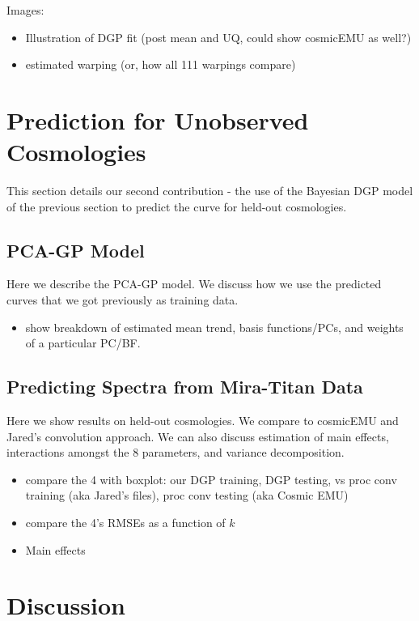 \documentclass[11pt]{article}
\begin{document}
Images:
\begin{itemize}
    \item Illustration of DGP fit (post mean and UQ, could show cosmicEMU as well?)
    \item estimated warping (or, how all 111 warpings compare)
\end{itemize}


\section{Prediction for Unobserved Cosmologies}
\label{sec:pred}

This section details our second contribution - the use of the Bayesian DGP model of the previous section to predict the curve for held-out cosmologies.

\subsection{PCA-GP Model}
\label{subsec:pca}

Here we describe the PCA-GP model.  We discuss how we use the predicted curves that we got previously as training data.

\begin{itemize}
    \item show breakdown of estimated mean trend, basis functions/PCs, and weights of a particular PC/BF.
\end{itemize}

\subsection{Predicting Spectra from Mira-Titan Data}
\label{subsec:mira_pred}

Here we show results on held-out cosmologies.  We compare to cosmicEMU and Jared's convolution approach. We can also discuss estimation of main effects, interactions amongst the 8 parameters, and variance decomposition.

\begin{itemize}
    \item compare the 4 with boxplot: our DGP training, DGP testing, vs proc conv training (aka Jared's files), proc conv testing (aka Cosmic EMU)
    \item compare the 4's RMSEs as a function of $k$
    \item Main effects
\end{itemize}

\section{Discussion}
\label{sec:disc}
\end{document}
